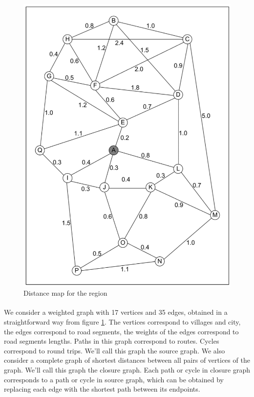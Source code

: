 \begin{figure}[H]
	\centering
	\includegraphics[scale=1]{./img/figure6-23.png}
	\caption{Distance map for the region}
	\label{figure6-23}
\end{figure}

\paragraph{}
We consider a weighted graph with 17 vertices and 35 edges, obtained in a straightforward way from figure \ref{figure6-23}. The vertices correspond to villages and city, the edges correspond to road segments, the weights of the edges correspond to road segments lengths. Paths in this graph correspond to routes. Cycles correspond to round trips. We'll call this graph the source graph. We also consider a complete graph of shortest distances between all pairs of vertices of the graph. We'll call this graph the closure graph. Each path or cycle in closure graph corresponds to a path or cycle in source graph, which can be obtained by replacing each edge with the shortest path between its endpoints.

